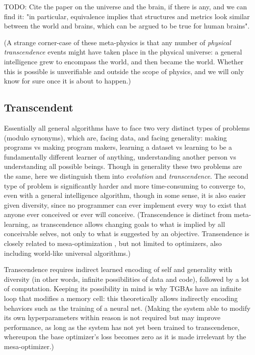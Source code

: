\documentclass{article}
\begin{document}
    TODO: Cite the paper on the universe and the brain, if there is any, and we can find it: "in particular, equivalence implies that structures and metrics look similar between the world and brains, which can be argued to be true for human brains".

(A strange corner-case of these meta-physics is that any number of \textit{physical transcendence} events might have taken place in the physical universe: a general intelligence grew to encompass the world, and then became the world. Whether this is possible is unverifiable and outside the scope of physics, and we will only know for sure once it is about to happen.)

\subsection{Transcendent}

Essentially all general algorithms have to face two very distinct types of problems (modulo synonyms), which are, facing data, and facing generality: making programs vs making program makers, learning a dataset vs learning to be a fundamentally different learner of anything, understanding another person vs understanding all possible beings. Though in generality these two problems are the same, here we distinguish them into \textit{evolution} and \textit{transcendence}. The second type of problem is significantly harder and more time-consuming to converge to, even with a general intelligence algorithm, though in some sense, it is also easier given diversity, since no programmer can ever implement every way to exist that anyone ever conceived or ever will conceive. (Transcendence is distinct from meta-learning, as transcendence allows changing goals to what is implied by all conceivable selves, not only to what is suggested by an objective. Transendence is closely related to mesa-optimization \cite{hubinger2019risks}, but not limited to optimizers, also including world-like universal algorithms.)

Transcendence requires indirect learned encoding of self and generality with diversity (in other words, infinite possibilities of data and code), followed by a lot of computation. Keeping its possibility in mind is why TGBAs have an infinite loop that modifies a memory cell: this theoretically allows indirectly encoding behaviors such as the training of a neural net. (Making the system able to modify its own hyperparameters within reason is not required but may improve performance, as long as the system has not yet been trained to transcendence, whereupon the base optimizer's loss becomes zero as it is made irrelevant by the mesa-optimizer.)
\end{document}
